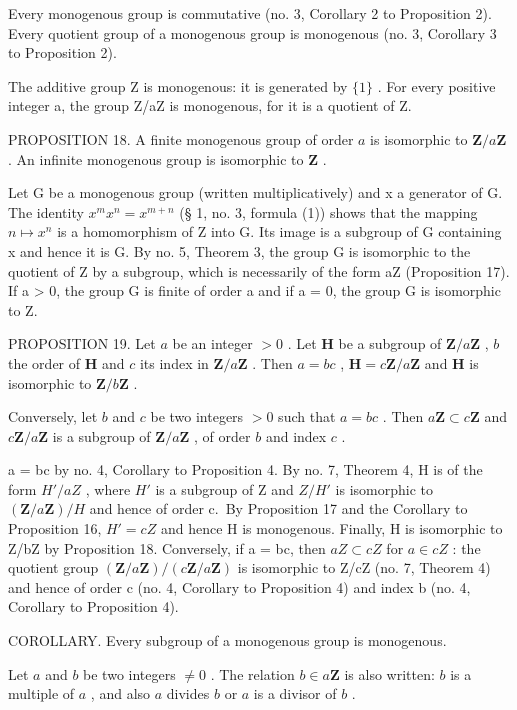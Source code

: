 Every monogenous group is commutative (no. 3, Corollary 2 to Proposition 2). Every quotient group of a monogenous group is monogenous (no. 3, Corollary 3 to Proposition 2).

The additive group Z is monogenous: it is generated by \(\{1\}\) . For every positive integer a, the group Z/aZ is monogenous, for it is a quotient of Z.

PROPOSITION 18. A finite monogenous group of order \(a\) is isomorphic to \(\mathbf{Z}/a\mathbf{Z}\) . An infinite monogenous group is isomorphic to \(\mathbf{Z}\) .

Let G be a monogenous group (written multiplicatively) and x a generator of G. The identity \(x^{m}x^{n} = x^{m+n}\) (§ 1, no. 3, formula (1)) shows that the mapping \(n \mapsto x^{n}\) is a homomorphism of Z into G. Its image is a subgroup of G containing x and hence it is G. By no. 5, Theorem 3, the group G is isomorphic to the quotient of Z by a subgroup, which is necessarily of the form aZ (Proposition 17). If a \textgreater{} 0, the group G is finite of order a and if a = 0, the group G is isomorphic to Z.

PROPOSITION 19. Let \(a\) be an integer \(>0\) . Let \(\mathbf{H}\) be a subgroup of \(\mathbf{Z}/a\mathbf{Z}\) , \(b\) the order of \(\mathbf{H}\) and \(c\) its index in \(\mathbf{Z}/a\mathbf{Z}\) . Then \(a = bc\) , \(\mathbf{H} = c\mathbf{Z}/a\mathbf{Z}\) and \(\mathbf{H}\) is isomorphic to \(\mathbf{Z}/b\mathbf{Z}\) .

Conversely, let \(b\) and \(c\) be two integers \(>0\) such that \(a = bc\) . Then \(a\mathbf{Z} \subset c\mathbf{Z}\) and \(c\mathbf{Z}/a\mathbf{Z}\) is a subgroup of \(\mathbf{Z}/a\mathbf{Z}\) , of order \(b\) and index \(c\) .

a = bc by no. 4, Corollary to Proposition 4. By no. 7, Theorem 4, H is of the form \(H'/aZ\) , where \(H'\) is a subgroup of Z and \(Z/H'\) is isomorphic to \((\mathbf{Z}/a\mathbf{Z})/H\) and hence of order c.~By Proposition 17 and the Corollary to Proposition 16, \(H' = cZ\) and hence H is monogenous. Finally, H is isomorphic to Z/bZ by Proposition 18. Conversely, if a = bc, then \(aZ \subset cZ\) for \(a \in cZ\) : the quotient group \((\mathbf{Z}/a\mathbf{Z})/(c\mathbf{Z}/a\mathbf{Z})\) is isomorphic to Z/cZ (no. 7, Theorem 4) and hence of order c (no. 4, Corollary to Proposition 4) and index b (no. 4, Corollary to Proposition 4).

COROLLARY. Every subgroup of a monogenous group is monogenous.

Let \(a\) and \(b\) be two integers \(\neq 0\) . The relation \(b \in a\mathbf{Z}\) is also written: \(b\) is a multiple of \(a\) , and also \(a\) divides \(b\) or \(a\) is a divisor of \(b\) .

